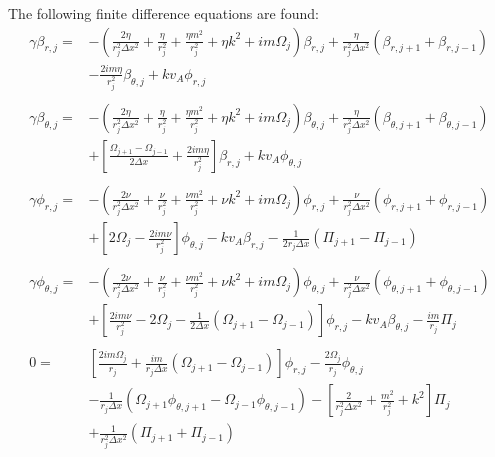 \documentclass[letterpaper]{article}
\begin{document}
The following finite difference equations are found:
\begin{align}
\gamma\beta_{r, j} = &-\left(\frac{2\eta}{r_j^2 \Delta x^2} 
 + \frac{\eta}{r_j^2}
 + \frac{\eta m^2}{r_j^2} + \eta k^2 + im\Omega_j \right)\beta_{r, j}
 + \frac{\eta}{r_j^2 \Delta x^2}(\beta_{r, j+1} + \beta_{r, j-1})
\nonumber \\
&- \frac{2im \eta}{r_j^2}\beta_{\theta,j} + k v_A \phi_{r,j}
\\
\nonumber \\
\gamma\beta_{\theta,j}=&-\left(\frac{2\eta}{r_j^2 \Delta x^2} 
 + \frac{\eta}{r_j^2} + \frac{\eta m^2}{r_j^2} 
 + \eta k^2 + im\Omega_j \right)\beta_{\theta, j}
 + \frac{\eta}{r_j^2 \Delta x^2}(\beta_{\theta, j+1} + \beta_{\theta, j-1})
\nonumber \\
&+\left[\frac{\Omega_{j+1}-\Omega_{j-1}}{2\Delta x}
 + \frac{2im\eta}{r_j^2}\right]\beta_{r,j} + kv_A\phi_{\theta,j}
\\
\nonumber \\
\gamma\phi_{r, j} = &-\left(\frac{2\nu}{r_j^2 \Delta x^2}
 + \frac{\nu}{r_j^2} + \frac{\nu m^2}{r_j^2} 
 + \nu k^2 + im\Omega_j \right)\phi_{r, j}
 + \frac{\nu}{r_j^2 \Delta x^2}(\phi_{r, j+1} + \phi_{r, j-1})
\nonumber \\
&+ \left[2\Omega_{j}-\frac{2im\nu}{r_j^2} \right]\phi_{\theta, j}
 - kv_A\beta_{r,j} - \frac{1}{2 r_j \Delta x}\left(\Pi_{j+1}-\Pi_{j-1}\right)
\\
\nonumber \\
\gamma\phi_{\theta, j} = &-\left(\frac{2\nu}{r_j^2 \Delta x^2} 
 + \frac{\nu}{r_j^2} + \frac{\nu m^2}{r_j^2} 
 + \nu k^2 + im\Omega_j\right)\phi_{\theta, j}
 + \frac{\nu}{r_j^2 \Delta x^2}(\phi_{\theta, j+1} + \phi_{\theta, j-1})
\nonumber \\
&+ \left[\frac{2im\nu}{r_j^2} - 2\Omega_j
 - \frac{1}{2\Delta x}\left(\Omega_{j+1}-\Omega_{j-1}\right)\right]\phi_{r,j}
 - kv_A \beta_{\theta, j} - \frac{im}{r_j}\Pi_{j}
\\
\nonumber \\
0 = &\left[\frac{2im\Omega_j}{r_j}
 + \frac{im}{r_j \Delta x}(\Omega_{j+1}-\Omega_{j-1})\right]\phi_{r,j}
 - \frac{2\Omega_j}{r_j}\phi_{\theta,j} 
\nonumber \\
&- \frac{1}{r_j \Delta x}\left(\Omega_{j+1}\phi_{\theta,j+1}
 -\Omega_{j-1}\phi_{\theta,j-1}\right)
 - \left[\frac{2}{r_j^2\Delta x^2} + \frac{m^2}{r_j^2}+k^2\right]\Pi_{j}
\nonumber \\
&+\frac{1}{r_j^2 \Delta x^2}\left(\Pi_{j+1} + \Pi_{j-1}\right)
\end{align}
\end{document}
